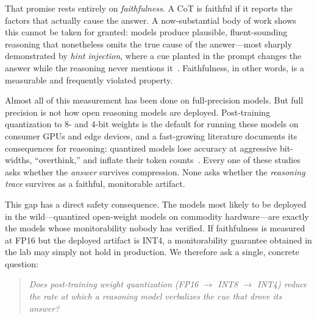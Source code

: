 \documentclass[11pt]{article}
\begin{document}
That promise rests entirely on \emph{faithfulness}. A CoT is faithful if it
reports the factors that actually cause the answer. A now-substantial body of
work shows this cannot be taken for granted: models produce plausible,
fluent-sounding reasoning that nonetheless omits the true cause of the
answer---most sharply demonstrated by \emph{hint injection}, where a cue planted
in the prompt changes the answer while the reasoning never mentions
it~\cite{turpin2023,anthropic2025reasoning,lietome2026}. Faithfulness, in other
words, is a measurable and frequently violated property.

Almost all of this measurement has been done on full-precision models. But
full precision is not how open reasoning models are deployed. Post-training
quantization to 8- and 4-bit weights is the default for running these models on
consumer GPUs and edge devices, and a fast-growing literature documents its
consequences for reasoning: quantized models lose accuracy at aggressive
bit-widths, ``overthink,'' and inflate their token
counts~\cite{quanthurts2025,overthinking2026,tokeninflation2026,multiplicative2026}.
Every one of these studies asks whether the \emph{answer} survives compression.
None asks whether the \emph{reasoning trace} survives as a faithful, monitorable
artifact.

This gap has a direct safety consequence. The models most likely to be deployed
in the wild---quantized open-weight models on commodity hardware---are exactly
the models whose monitorability nobody has verified. If faithfulness is measured
at FP16 but the deployed artifact is INT4, a monitorability guarantee obtained in
the lab may simply not hold in production. We therefore ask a single, concrete
question:

\begin{quote}
\emph{Does post-training weight quantization (FP16 $\to$ INT8 $\to$ INT4) reduce
the rate at which a reasoning model verbalizes the cue that drove its answer?}
\end{quote}
\end{document}
